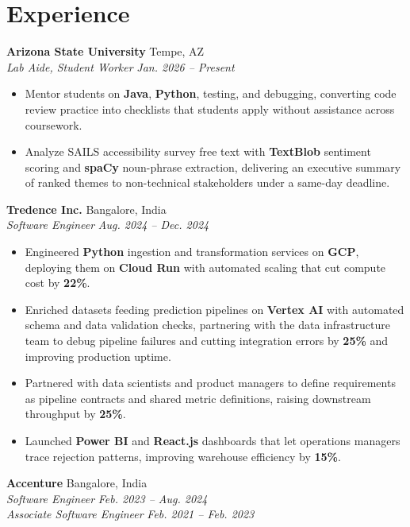 \documentclass[letterpaper,10pt]{article}
\newcommand{\resumeheading}[4]{\textbf{#1} \hfill {\small #2} \\[-1pt] \textit{\small #3} \hfill {\small\textit{#4}}}
\begin{document}
\section{Experience}
\resumeheading{Arizona State University}{Tempe, AZ}{Lab Aide, Student Worker}{Jan. 2026 -- Present}
\begin{itemize}
\item Mentor students on \textbf{Java}, \textbf{Python}, testing, and debugging, converting code review practice into checklists that students apply without assistance across coursework.
\item Analyze SAILS accessibility survey free text with \textbf{TextBlob} sentiment scoring and \textbf{spaCy} noun-phrase extraction, delivering an executive summary of ranked themes to non-technical stakeholders under a same-day deadline.
\end{itemize}
\vspace{2pt}
\resumeheading{Tredence Inc.}{Bangalore, India}{Software Engineer}{Aug. 2024 -- Dec. 2024}
\begin{itemize}
\item Engineered \textbf{Python} ingestion and transformation services on \textbf{GCP}, deploying them on \textbf{Cloud Run} with automated scaling that cut compute cost by \textbf{22\%}.
\item Enriched datasets feeding prediction pipelines on \textbf{Vertex AI} with automated schema and data validation checks, partnering with the data infrastructure team to debug pipeline failures and cutting integration errors by \textbf{25\%} and improving production uptime.
\item Partnered with data scientists and product managers to define requirements as pipeline contracts and shared metric definitions, raising downstream throughput by \textbf{25\%}.
\item Launched \textbf{Power BI} and \textbf{React.js} dashboards that let operations managers trace rejection patterns, improving warehouse efficiency by \textbf{15\%}.
\end{itemize}
\vspace{2pt}
\textbf{Accenture} \hfill {\small Bangalore, India} \\[-1pt]
\textit{\small Software Engineer} \hfill {\small\textit{Feb. 2023 -- Aug. 2024}} \\[-1pt]
\textit{\small Associate Software Engineer} \hfill {\small\textit{Feb. 2021 -- Feb. 2023}}
\end{document}
